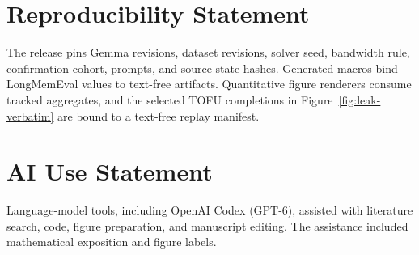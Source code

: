 \section*{Reproducibility Statement}
The release pins Gemma revisions, dataset revisions, solver seed, bandwidth
rule, confirmation cohort, prompts, and source-state hashes. Generated macros
bind LongMemEval values to text-free artifacts. Quantitative figure
renderers consume tracked aggregates, and the selected TOFU completions in
Figure~\ref{fig:leak-verbatim} are bound to a text-free replay manifest.

\section*{AI Use Statement}
Language-model tools, including OpenAI Codex (GPT-6), assisted with literature
search, code, figure preparation, and manuscript editing. The assistance included mathematical exposition and figure labels.
